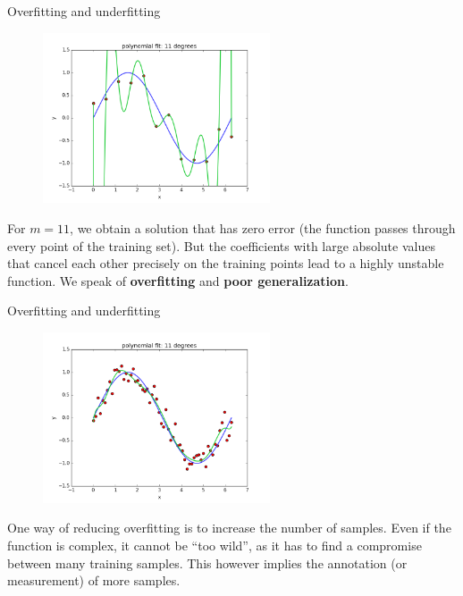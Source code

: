 \documentclass[xcolor=pdftex,dvipsnames,table]{beamer}
\begin{document}
\begin{frame}{Overfitting and underfitting}
\begin{figure}[htb]
\includegraphics[width=0.6\textwidth]{../graphics/polyfit_degree_11.png}
\end{figure}
For $m=11$, we obtain a solution that has zero error (the function passes through every point of the training set). But the coefficients with large absolute values that cancel each other precisely on the training points lead to a highly unstable function. We speak of \textbf{overfitting} and \textbf{poor generalization}.
\end{frame}

\begin{frame}{Overfitting and underfitting}
\begin{figure}[htb]
\includegraphics[width=0.6\textwidth]{../graphics/polyfit_degree_11_N60.png}
\end{figure}
One way of reducing overfitting is to increase the number of samples. Even if the function is complex, it cannot be “too wild”, as it has to find a compromise between many training samples. This however implies the annotation (or measurement) of more samples. 
\end{frame}
\end{document}
